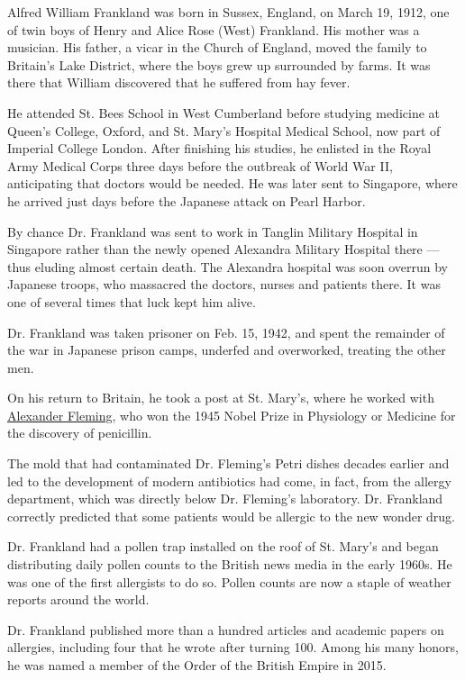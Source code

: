 Alfred William Frankland was born in Sussex, England, on March 19, 1912,
one of twin boys of Henry and Alice Rose (West) Frankland. His mother
was a musician. His father, a vicar in the Church of England, moved the
family to Britain's Lake District, where the boys grew up surrounded by
farms. It was there that William discovered that he suffered from hay
fever.

He attended St. Bees School in West Cumberland before studying medicine
at Queen's College, Oxford, and St. Mary's Hospital Medical School, now
part of Imperial College London. After finishing his studies, he
enlisted in the Royal Army Medical Corps three days before the outbreak
of World War II, anticipating that doctors would be needed. He was later
sent to Singapore, where he arrived just days before the Japanese attack
on Pearl Harbor.

By chance Dr. Frankland was sent to work in Tanglin Military Hospital in
Singapore rather than the newly opened Alexandra Military Hospital there
--- thus eluding almost certain death. The Alexandra hospital was soon
overrun by Japanese troops, who massacred the doctors, nurses and
patients there. It was one of several times that luck kept him alive.

Dr. Frankland was taken prisoner on Feb. 15, 1942, and spent the
remainder of the war in Japanese prison camps, underfed and overworked,
treating the other men.

On his return to Britain, he took a post at St. Mary's, where he worked
with
\href{https://www.nytimes3xbfgragh.onion/1955/03/12/archives/sir-alexander-fleming.html}{Alexander
Fleming}, who won the 1945 Nobel Prize in Physiology or Medicine for the
discovery of penicillin.

The mold that had contaminated Dr. Fleming's Petri dishes decades
earlier and led to the development of modern antibiotics had come, in
fact, from the allergy department, which was directly below Dr.
Fleming's laboratory. Dr. Frankland correctly predicted that some
patients would be allergic to the new wonder drug.

Dr. Frankland had a pollen trap installed on the roof of St. Mary's and
began distributing daily pollen counts to the British news media in the
early 1960s. He was one of the first allergists to do so. Pollen counts
are now a staple of weather reports around the world.

Dr. Frankland published more than a hundred articles and academic papers
on allergies, including four that he wrote after turning 100. Among his
many honors, he was named a member of the Order of the British Empire in
2015.

